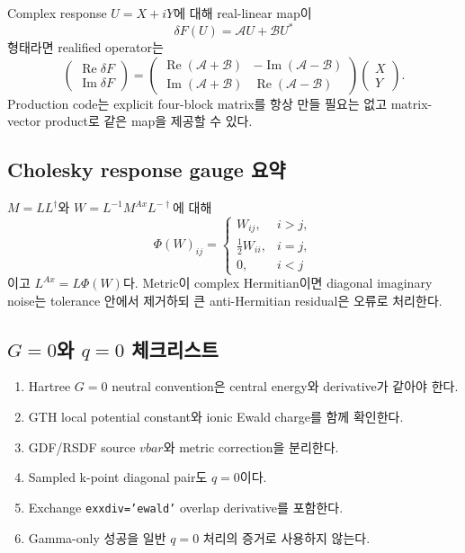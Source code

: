 Complex response $U=X+iY$에 대해 real-linear map이
\begin{equation}
  \delta F(U)=\mathcal A U+\mathcal B U^*
  \label{eq:appendix-complex-map}
\end{equation}
형태라면 realified operator는
\begin{equation}
  \begin{pmatrix}
    \operatorname{Re}\delta F\\
    \operatorname{Im}\delta F
  \end{pmatrix}
  =
  \begin{pmatrix}
    \operatorname{Re}(\mathcal A+\mathcal B) &
    -\operatorname{Im}(\mathcal A-\mathcal B)\\
    \operatorname{Im}(\mathcal A+\mathcal B) &
    \operatorname{Re}(\mathcal A-\mathcal B)
  \end{pmatrix}
  \begin{pmatrix}X\\Y\end{pmatrix}.
  \label{eq:appendix-real-hessian}
\end{equation}
Production code는 explicit four-block matrix를 항상 만들 필요는 없고 matrix-vector
product로 같은 map을 제공할 수 있다.

\subsection{Cholesky response gauge 요약}

$M=LL^\dagger$와 $W=L^{-1}M^{Ax}L^{-\dagger}$에 대해
\begin{equation}
  \Phi(W)_{ij}
  =\begin{cases}
    W_{ij},&i>j,\\
    \tfrac12W_{ii},&i=j,\\
    0,&i<j
  \end{cases}
  \label{eq:appendix-cholesky-phi}
\end{equation}
이고 $L^{Ax}=L\Phi(W)$다. Metric이 complex Hermitian이면 diagonal imaginary noise는
tolerance 안에서 제거하되 큰 anti-Hermitian residual은 오류로 처리한다.

\subsection{\texorpdfstring{$G=0$와 $q=0$}{G=0 and q=0} 체크리스트}

\begin{enumerate}
  \item Hartree $G=0$ neutral convention은 central energy와 derivative가 같아야 한다.
  \item GTH local potential constant와 ionic Ewald charge를 함께 확인한다.
  \item GDF/RSDF source $vbar$와 metric correction을 분리한다.
  \item Sampled k-point diagonal pair도 $q=0$이다.
  \item Exchange \texttt{exxdiv='ewald'} overlap derivative를 포함한다.
  \item Gamma-only 성공을 일반 $q=0$ 처리의 증거로 사용하지 않는다.
\end{enumerate}

